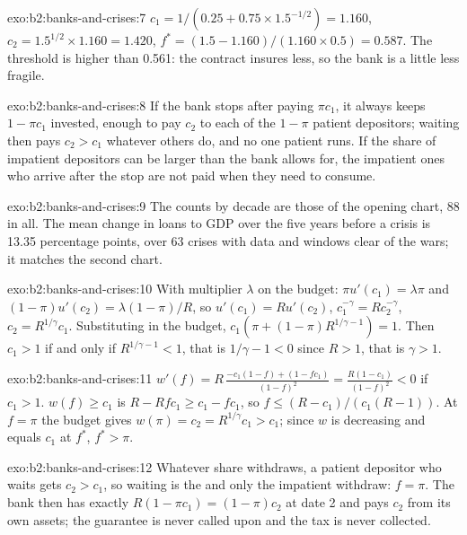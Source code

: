 \begin{solution}{exo:b2:banks-and-crises:7}
$c_1 = 1/(0.25 + 0.75 \times 1.5^{-1/2}) = 1.160$, $c_2 = 1.5^{1/2} \times 1.160 = 1.420$,
$f^* = (1.5 - 1.160)/(1.160 \times 0.5) = 0.587$. The threshold is higher than 0.561: the contract insures less, so
the bank is a little less fragile.
\end{solution}

\begin{solution}{exo:b2:banks-and-crises:8}
If the bank stops after paying $\pi c_1$, it always keeps $1 - \pi c_1$ invested, enough to pay $c_2$ to each of the
$1 - \pi$ patient depositors; waiting then pays $c_2 > c_1$ whatever others do, and no one patient runs. If the share of
impatient depositors can be larger than the bank allows for, the impatient ones who arrive after the stop are not paid when
they need to consume.
\end{solution}

\begin{solution}{exo:b2:banks-and-crises:9}
The counts by decade are those of the opening chart, 88 in all. The mean change in loans to GDP over the five years before
a crisis is 13.35 percentage points, over 63 crises with data and windows clear of the wars; it matches the second chart.
\end{solution}

\begin{solution}{exo:b2:banks-and-crises:10}
With multiplier $\lambda$ on the budget: $\pi u'(c_1) = \lambda\pi$ and $(1 - \pi)u'(c_2) = \lambda(1 - \pi)/R$, so
$u'(c_1) = Ru'(c_2)$, $c_1^{-\gamma} = Rc_2^{-\gamma}$, $c_2 = R^{1/\gamma}c_1$. Substituting in the budget,
$c_1(\pi + (1 - \pi)R^{1/\gamma - 1}) = 1$. Then $c_1 > 1$ if and only if $R^{1/\gamma - 1} < 1$, that is $1/\gamma - 1 <
0$ since $R > 1$, that is $\gamma > 1$.
\end{solution}

\begin{solution}{exo:b2:banks-and-crises:11}
$w'(f) = R\,\frac{-c_1(1 - f) + (1 - fc_1)}{(1 - f)^2} = \frac{R(1 - c_1)}{(1 - f)^2} < 0$ if $c_1 > 1$.
$w(f) \geq c_1$ is $R - Rfc_1 \geq c_1 - fc_1$, so $f \leq (R - c_1)/(c_1(R - 1))$. At $f = \pi$ the budget gives
$w(\pi) = c_2 = R^{1/\gamma}c_1 > c_1$; since $w$ is decreasing and equals $c_1$ at $f^*$, $f^* > \pi$.
\end{solution}

\begin{solution}{exo:b2:banks-and-crises:12}
Whatever share withdraws, a patient depositor who waits gets $c_2 > c_1$, so waiting is the  and only the
impatient withdraw: $f = \pi$. The bank then has exactly $R(1 - \pi c_1) = (1 - \pi)c_2$ at date 2 and pays $c_2$ from its
own assets; the guarantee is never called upon and the tax is never collected.
\end{solution}

